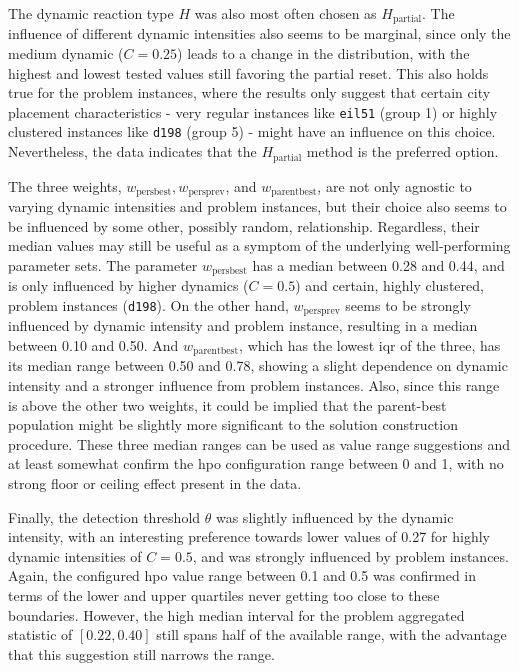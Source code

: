 The dynamic reaction type $H$ was also most often chosen as $H_\text{partial}$. The influence of different dynamic intensities also seems to be marginal, since only the medium dynamic ($C=0.25$) leads to a change in the distribution, with the highest and lowest tested values still favoring the partial reset. This also holds true for the problem instances, where the results only suggest that certain city placement characteristics - very regular instances like \texttt{eil51} (group 1) or highly clustered instances like \texttt{d198} (group 5) - might have an influence on this choice. Nevertheless, the data indicates that the $H_\text{partial}$ method is the preferred option.

The three weights, $w_{\text{persbest}}, w_{\text{persprev}}$, and $w_{\text{parentbest}}$, are not only agnostic to varying dynamic intensities and problem instances, but their choice also seems to be influenced by some other, possibly random, relationship. Regardless, their median values may still be useful as a symptom of the underlying well-performing parameter sets. The parameter $w_{\text{persbest}}$ has a median between 0.28 and 0.44, and is only influenced by higher dynamics ($C=0.5$) and certain, highly clustered, problem instances (\texttt{d198}). On the other hand, $w_{\text{persprev}}$ seems to be strongly influenced by dynamic intensity and problem instance, resulting in a median between 0.10 and 0.50. And $w_{\text{parentbest}}$, which has the lowest \gls{iqr} of the three, has its median range between 0.50 and 0.78, showing a slight dependence on dynamic intensity and a stronger influence from problem instances. Also, since this range is above the other two weights, it could be implied that the parent-best population might be slightly more significant to the solution construction procedure. These three median ranges can be used as value range suggestions and at least somewhat confirm the \gls{hpo} configuration range between 0 and 1, with no strong floor or ceiling effect present in the data.  

Finally, the detection threshold $\theta$ was slightly influenced by the dynamic intensity, with an interesting preference towards lower values of 0.27 for highly dynamic intensities of $C=0.5$, and was strongly influenced by problem instances. Again, the configured \gls{hpo} value range between 0.1 and 0.5 was confirmed in terms of the lower and upper quartiles never getting too close to these boundaries. However, the high median interval for the problem aggregated statistic of $[0.22, 0.40]$ still spans half of the available range, with the advantage that this suggestion still narrows the range.

